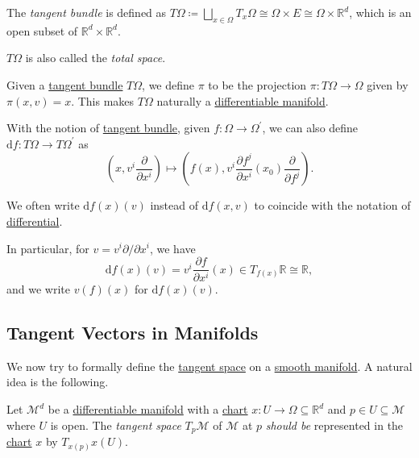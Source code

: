 \begin{definition}\label{def:tangent-bundle-of-Euclidean-space}
	The \emph{tangent bundle} is defined as \(T \Omega\coloneqq \bigsqcup_{x\in \Omega }T_x \Omega \cong \Omega \times E \cong \Omega \times \mathbb{R} ^d\), which is an open subset of \(\mathbb{R} ^d \times \mathbb{R} ^d\).
\end{definition}

\begin{note}
	\(T \Omega \) is also called the \emph{total space}.
\end{note}

\begin{remark}
	Given a \hyperref[def:tangent-bundle-of-Euclidean-space]{tangent bundle} \(T \Omega \), we define \(\pi \) to be the projection \(\pi \colon T \Omega \to \Omega\) given by \(\pi (x, v) = x\). This makes \(T \Omega \) naturally a \hyperref[def:smooth-manifold]{differentiable manifold}.
\end{remark}

With the notion of \hyperref[def:tangent-bundle-of-Euclidean-space]{tangent bundle}, given \(f\colon \Omega \to \Omega ^\prime \), we can also define \(\mathrm{d} f\colon T \Omega \to T \Omega ^\prime \) as
\[
	\left( x, v^i \frac{\partial }{\partial x^i} \right) \mapsto \left( f(x), v^i \frac{\partial f^j}{\partial x^i} (x_0) \frac{\partial }{\partial f^j}  \right).
\]

\begin{notation}
	We often write \(\mathrm{d} f(x)(v)\) instead of \(\mathrm{d} f(x, v)\) to coincide with the notation of \hyperref[def:differential-of-Euclidean-space]{differential}.
\end{notation}

In particular, for \(v = v^i \partial / \partial x^i\), we have
\[
	\mathrm{d} f(x)(v) = v^i \frac{\partial f}{\partial x^i} (x)\in T_{f(x)}\mathbb{R} \cong \mathbb{R},
\]
and we write \(v(f)(x)\) for \(\mathrm{d} f(x)(v)\).

\subsection{Tangent Vectors in Manifolds}
We now try to formally define the \hyperref[def:tangent-space]{tangent space} on a \hyperref[def:smooth-manifold]{smooth manifold}. A natural idea is the following.

\begin{intuition}
	Let \(\mathcal{M}^d \) be a \hyperref[def:smooth-manifold]{differentiable manifold} with a \hyperref[def:coordinate-chart]{chart} \(x\colon U \to \Omega \subseteq \mathbb{R} ^d\) and \(p\in U \subseteq \mathcal{M} \) where \(U\) is open. The \emph{tangent space} \(T_p \mathcal{M} \) of \(\mathcal{M} \) at \(p\) \emph{should be} represented in the \hyperref[def:coordinate-chart]{chart} \(x\) by \(T_{x(p)}x(U)\).
\end{intuition}

